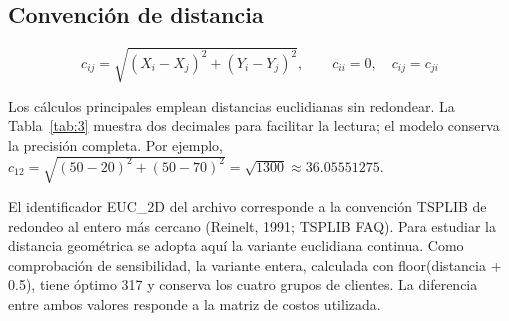 \documentclass[11pt,a4paper]{article}
\numberwithin{equation}{section}
\begin{document}
\subsection{Convención de distancia}


\begin{equation}\label{eq:distancia}
c_{ij}=\sqrt{(X_i-X_j)^2+(Y_i-Y_j)^2},\qquad c_{ii}=0,\quad c_{ij}=c_{ji}
\end{equation}


Los cálculos principales emplean distancias euclidianas sin redondear. La Tabla~\ref{tab:3} muestra dos decimales para facilitar la lectura; el modelo conserva la precisión completa. Por ejemplo, \(c_{12}=\sqrt{(50-20)^2+(50-70)^2}=\sqrt{1300}\approx36.05551275\).


El identificador EUC\_2D del archivo corresponde a la convención TSPLIB de redondeo al entero más cercano (Reinelt, 1991; TSPLIB FAQ). Para estudiar la distancia geométrica se adopta aquí la variante euclidiana continua. Como comprobación de sensibilidad, la variante entera, calculada con floor(distancia + 0.5), tiene óptimo 317 y conserva los cuatro grupos de clientes. La diferencia entre ambos valores responde a la matriz de costos utilizada.


\Needspace{130pt}
\end{document}
